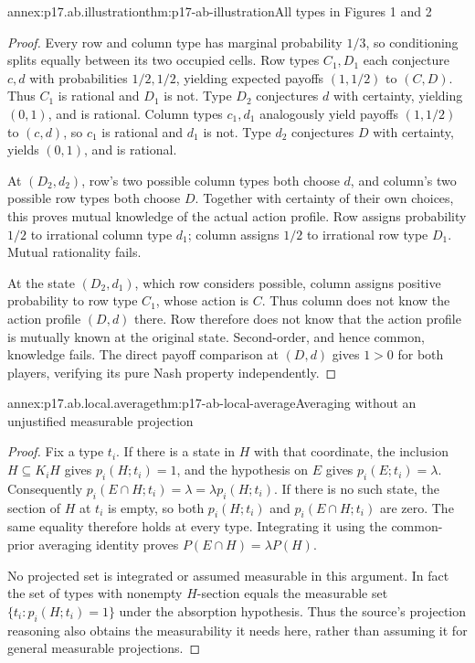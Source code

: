 \begin{annexitem}{annex:p17.ab.illustration}{thm:p17-ab-illustration}{All types in Figures 1 and 2}
\begin{proof}
Every row and column type has marginal probability \(1/3\),
so conditioning splits equally between its two occupied cells.
Row types \(C_1,D_1\) each conjecture \(c,d\) with probabilities
\(1/2,1/2\), yielding expected payoffs \((1,1/2)\) to \((C,D)\).
Thus \(C_1\) is rational and \(D_1\) is not. Type \(D_2\)
conjectures \(d\) with certainty, yielding \((0,1)\), and is rational.
Column types \(c_1,d_1\) analogously yield payoffs \((1,1/2)\)
to \((c,d)\), so \(c_1\) is rational and \(d_1\) is not.
Type \(d_2\) conjectures \(D\) with certainty, yields \((0,1)\),
and is rational.

At \((D_2,d_2)\), row's two possible column types both choose
\(d\), and column's two possible row types both choose \(D\).
Together with certainty of their own choices, this proves mutual
knowledge of the actual action profile. Row assigns probability
\(1/2\) to irrational column type \(d_1\); column assigns
\(1/2\) to irrational row type \(D_1\). Mutual rationality fails.

At the state \((D_2,d_1)\), which row considers possible,
column assigns positive probability to row type \(C_1\), whose
action is \(C\). Thus column does not know the action profile
\((D,d)\) there. Row therefore does not know that the action
profile is mutually known at the original state. Second-order,
and hence common, knowledge fails. The direct payoff comparison
at \((D,d)\) gives \(1>0\) for both players, verifying its
pure Nash property independently.
\end{proof}
\end{annexitem}

\begin{annexitem}{annex:p17.ab.local.average}{thm:p17-ab-local-average}{Averaging without an unjustified measurable projection}
\begin{proof}
Fix a type \(t_i\). If there is a state in \(H\) with that
coordinate, the inclusion \(H\subseteq K_iH\) gives
\(p_i(H;t_i)=1\), and the hypothesis on \(E\) gives
\(p_i(E;t_i)=\lambda\). Consequently
\(p_i(E\cap H;t_i)=\lambda=\lambda p_i(H;t_i)\).
If there is no such state, the section of \(H\) at \(t_i\)
is empty, so both \(p_i(H;t_i)\) and \(p_i(E\cap H;t_i)\)
are zero. The same equality therefore holds at every type.
Integrating it using the common-prior averaging identity proves
\(P(E\cap H)=\lambda P(H)\).

No projected set is integrated or assumed measurable in this
argument. In fact the set of types with nonempty \(H\)-section
equals the measurable set \(\{t_i:p_i(H;t_i)=1\}\) under the
absorption hypothesis. Thus the source's projection reasoning
also obtains the measurability it needs here, rather than
assuming it for general measurable projections.
\end{proof}
\end{annexitem}

